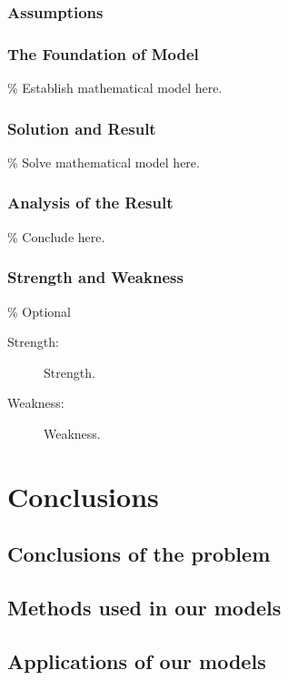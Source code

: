 \documentclass{apmcmthesis}
\begin{document}
\subsubsection{Assumptions}


\subsubsection{The Foundation of Model}
\% Establish mathematical model here.


\subsubsection{Solution and Result}
\% Solve mathematical model here.


\subsubsection{Analysis of the Result}
\% Conclude here.


\subsubsection{Strength and Weakness}
\% Optional
\begin{description}
	\item[Strength:] Strength.
	\item[Weakness:] Weakness.
\end{description}


\section{Conclusions}

\subsection{Conclusions of the problem}



\subsection{Methods used in our models}



\subsection{Applications of our models}
\end{document}
